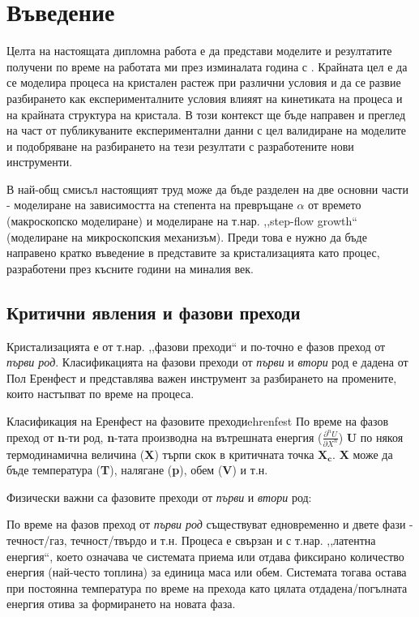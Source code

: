 \setcounter{page}{2}
\section{Въведение}
Целта на настоящата дипломна работа е да представи моделите и резултатите получени по време на работата ми през изминалата година с \vT. Крайната цел е да се моделира процеса на кристален растеж при различни условия и да се развие разбирането как експерименталните условия влияят на кинетиката на процеса и на крайната структура на кристала. В този контекст ще бъде направен и преглед на част от публикуваните експериментални данни с цел валидиране на моделите и подобряване на разбирането на тези резултати с разработените нови инструменти.

В най-общ смисъл настоящият труд може да бъде разделен на две основни части - моделиране на зависимостта на степента на превръщане $\alpha$ от времето (макроскопско моделиране) и моделиране на т.нар. ,,step-flow growth``  (моделиране на микроскопския механизъм). Преди това е нужно да бъде направено кратко въведение в представите за кристализацията като процес, разработени през късните години на миналия век.

\subsection{Критични явления и фазови преходи}
Кристализацията е от т.нар. ,,фазови преходи`` и по-точно е фазов преход от \textit{първи род}. Класификацията на фазови преходи от \textit{първи} и \textit{втори} род е дадена от Пол Еренфест \cite{Jaeger1998} \cite{atkinspaula2008} и представлява важен инструмент за разбирането на промените, които настъпват по време на процеса.

\begin{definition}{Класификация на Еренфест на фазовите преходи}{ehrenfest}
	По време на фазов преход от \textbf{n}-ти род, \textbf{n}-тата производна на вътрешната енергия ($\frac{\partial^n U}{\partial X^n}$) \textbf{U} по някоя термодинамична величина (\textbf{X}) търпи скок в критичната точка $\boldsymbol{X_c}$. \textbf{X} може да бъде температура (\textbf{T}), налягане (\textbf{p}), обем (\textbf{V}) и т.н.
\end{definition}

\noindent Физически важни са фазовите преходи от \textit{първи} и \textit{втори} род:

По време на фазов преход от \textit{първи род} съществуват едновременно и двете фази - течност/газ, течност/твърдо и т.н. Процеса е свързан и с т.нар. ,,латентна енергия``, което означава че системата приема или отдава фиксирано количество енергия (най-често топлина) за единица маса или обем. Системата тогава остава при постоянна температура по време на прехода като цялата отдадена/погълната енергия отива за формирането на новата фаза.

